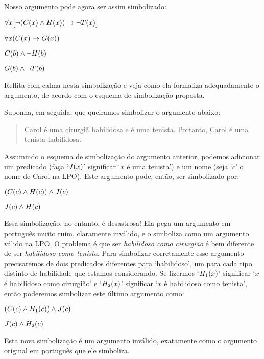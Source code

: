 Nosso argumento pode agora ser assim simbolizado:
\begin{earg}
\label{surgeon2}
\item[] $\forall x\bigl[\neg (\mathord{C}(x) \wedge \mathord{H}(x)) \rightarrow \neg \mathord{T}(x)\bigr]$
\item[] $\forall x(\mathord{C}(x) \rightarrow \mathord{G}(x))$
\item[] $\mathord{C}(b) \wedge \neg \mathord{H}(b)$
\item[\therefore] $\mathord{G}(b) \wedge \neg \mathord{T}(b)$
\end{earg}
Reflita com calma nesta simbolização e veja como ela formaliza adequadamente o argumento, de acordo com o esquema de simbolização proposta.

Suponha, em seguida, que queiramos simbolizar o argumento abaixo:
\begin{quote}
\label{surgeon3}
Carol é uma cirurgiã habilidosa e é uma tenista. Portanto, Carol é uma tenista habilidosa.
\end{quote}
Assumindo o esquema de simbolização do argumento anterior, podemos adicionar um predicado (faça `$\mathord{J}(x)$' significar `$x$ é uma tenista') e um nome (seja `$c$' o nome de Carol na LPO).
Este argumento pode, então, ser simbolizado por:
\begin{earg}
\item[] $(\mathord{C}(c) \wedge \mathord{H}(c)) \wedge \mathord{J}(c)$
\item[\therefore] $\mathord{J}(c) \wedge \mathord{H}(c)$
\end{earg}
Essa simbolização, no entanto, é desastrosa!
Ela pega um argumento em português muito ruim, claramente inválido, e o simboliza como um argumento válido na LPO.
O problema é que ser \emph{habilidoso como cirurgião} é bem diferente de ser \emph{habilidoso como tenista}.
Para simbolizar corretamente esse argumento precisaremos de dois predicados diferentes para `habilidoso', um para cada tipo distinto de habilidade que estamos considerando.
Se fizermos `$\mathord{H_1}(x)$' significar `$x$ é habilidoso como cirurgião' e `$\mathord{H_2}(x)$' significar `$x$ é habilidoso como tenista', então poderemos simbolizar este último argumento como:
\begin{earg}
\label{surgeon3correct}
\item[] $(\mathord{C}(c) \wedge \mathord{H_1}(c)) \wedge \mathord{J}(c)$
\item[\therefore] $\mathord{J}(c) \wedge \mathord{H_2}(c)$
\end{earg}
Esta nova simbolização é um argumento inválido, exatamente como o argumento original em português que ele simboliza.

